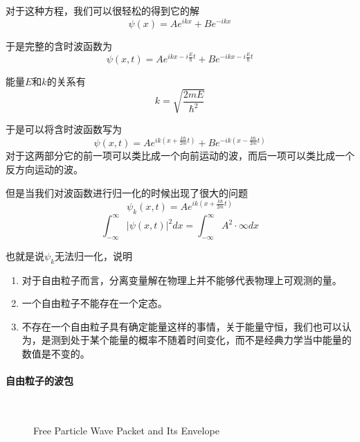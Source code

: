 \documentclass{article}
\begin{document}
对于这种方程，我们可以很轻松的得到它的解
\[\psi(x)=Ae^{ikx}+Be^{-ikx}\]

于是完整的含时波函数为
\[\psi(x,t)=Ae^{ikx-i\frac{E}{\hbar} t}+Be^{-ikx-i\frac{E}{\hbar} t}\]

能量$E$和$k$的关系有
\[
	k=\sqrt{\frac{2mE}{\hbar^2}}
\]

于是可以将含时波函数写为
\[
	\psi(x,t)=Ae^{ik(x+\frac{k\hbar}{2m}t)}+Be^{-ik(x-\frac{k\hbar}{2m}t)}
\]
对于这两部分它的前一项可以类比成一个向前运动的波，而后一项可以类比成一个反方向运动的波。

但是当我们对波函数进行归一化的时候出现了很大的问题
\[\psi_k(x,t)=Ae^{ik(x+\frac{k\hbar}{2m}t)}\]
\[\int_{-\infty}^{\infty}|\psi(x,t)|^2dx=\int_{-\infty}^{\infty}A^2\cdot\infty dx\]

也就是说$\psi_k$无法归一化，说明
\begin{enumerate}
	\item 对于自由粒子而言，分离变量解在物理上并不能够代表物理上可观测的量。
	\item 一个自由粒子不能存在一个定态。
	\item 不存在一个自由粒子具有确定能量这样的事情，关于能量守恒，我们也可以认为，是测到处于某个能量的概率不随着时间变化，而不是经典力学当中能量的数值是不变的。
\end{enumerate}

\paragraph{自由粒子的波包}\ \\

\begin{figure}[h!]
	\centering
	\caption{Free Particle Wave Packet and Its Envelope}
	\label{fig:wave-packet}
\end{figure}
\end{document}

